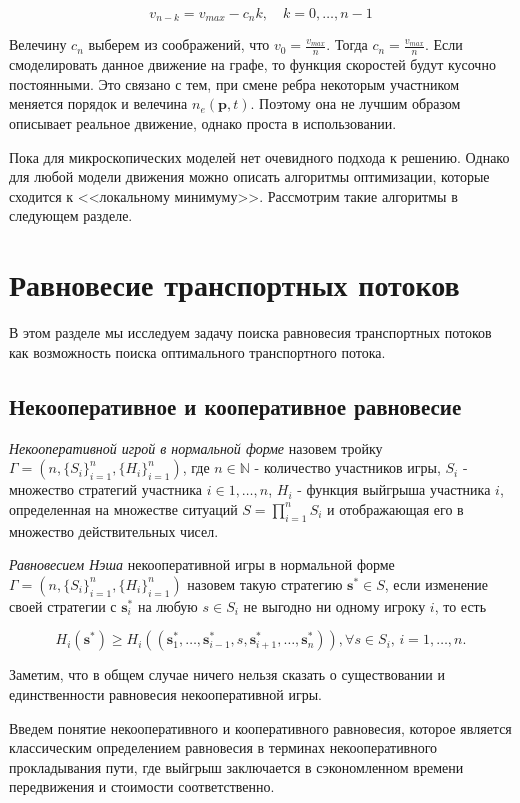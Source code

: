 \documentclass[12pt, a4paper]{article}
\begin{document}
$$v_{n - k} = v_{max} - c_n k, \quad k = 0, \dots, n - 1$$

Велечину $c_n$ выберем из соображений, что $v_0 = \frac{v_{max}}{n}$. Тогда $c_n = \frac{v_{max}}{n}$. Если смоделировать данное движение на графе, то функция скоростей будут кусочно постоянными. Это связано с тем, при смене ребра некоторым участником меняется порядок и велечина $n_e(\textbf{p}, t)$. Поэтому она не лучшим образом описывает реальное движение, однако проста в использовании.

Пока для микроскопических моделей нет очевидного подхода к решению. Однако для любой модели движения можно описать алгоритмы оптимизации, которые сходится к <<локальному минимуму>>. Рассмотрим такие алгоритмы в следующем разделе.

\newpage
\section{Равновесие транспортных потоков}
\label{sec:rovn}
В этом разделе мы исследуем задачу поиска равновесия транспортных потоков как возможность поиска оптимального транспортного потока.

\subsection{Некооперативное и кооперативное равновесие}

\textit{Некооперативной игрой в нормальной форме} назовем тройку $\Gamma = (n, \{S_i\}_{i = 1}^n, \{H_i\}_{i = 1}^n)$, где $n \in \mathbb{N}$ - количество участников игры, $S_i$ - множество стратегий участника $i \in {1, \dots, n}$, $H_i$ - функция выйгрыша участника $i$, определенная на множестве ситуаций $S = \prod\limits_{i = 1}^n S_i$ и отображающая его в множество действительных чисел.

\textit{Равновесием Нэша} некооперативной игры в нормальной форме $\Gamma = (n, \{S_i\}_{i = 1}^n, \{H_i\}_{i = 1}^n)$ назовем такую стратегию $\textbf{s}^* \in S$, если изменение своей стратегии с $\textbf{s}_i^*$ на любую $s \in S_i$ не выгодно ни одному игроку $i$, то есть

$$H_i(\textbf{s}^*) \ge H_i(\left(\textbf{s}^*_1, \ldots, \textbf{s}^*_{i - 1}, s, \textbf{s}^*_{i + 1}, \ldots, \textbf{s}^*_{n} \right)), \forall s \in S_i, \, i = 1, \dots, n. $$ 

Заметим, что в общем случае ничего нельзя сказать о существовании и единственности равновесия некооперативной игры.

Введем понятие некооперативного и кооперативного равновесия, которое является классическим определением равновесия в терминах некооперативного прокладывания пути, где выйгрыш заключается в сэкономленном времени передвижения и стоимости соответственно.
\end{document}
